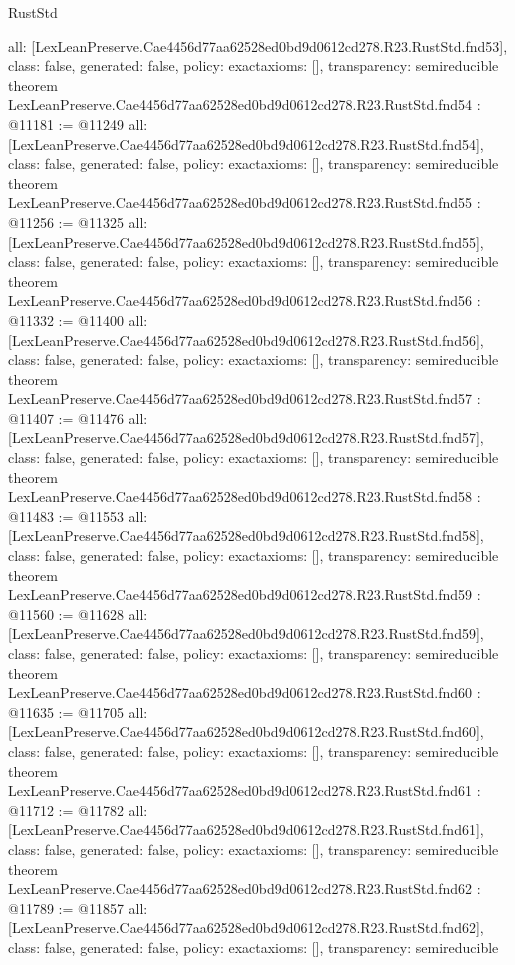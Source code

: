 \begin{lexlean}{RustStd}
\begin{coremodule}
{  all: [LexLeanPreserve.Cae4456d77aa62528ed0bd9d0612cd278.R23.RustStd.fnd53],
  class: false,
  generated: false,
  policy: exact{axioms: []},
  transparency: semireducible
}
theorem LexLeanPreserve.Cae4456d77aa62528ed0bd9d0612cd278.R23.RustStd.fnd54 : @11181 := @11249 {
  all: [LexLeanPreserve.Cae4456d77aa62528ed0bd9d0612cd278.R23.RustStd.fnd54],
  class: false,
  generated: false,
  policy: exact{axioms: []},
  transparency: semireducible
}
theorem LexLeanPreserve.Cae4456d77aa62528ed0bd9d0612cd278.R23.RustStd.fnd55 : @11256 := @11325 {
  all: [LexLeanPreserve.Cae4456d77aa62528ed0bd9d0612cd278.R23.RustStd.fnd55],
  class: false,
  generated: false,
  policy: exact{axioms: []},
  transparency: semireducible
}
theorem LexLeanPreserve.Cae4456d77aa62528ed0bd9d0612cd278.R23.RustStd.fnd56 : @11332 := @11400 {
  all: [LexLeanPreserve.Cae4456d77aa62528ed0bd9d0612cd278.R23.RustStd.fnd56],
  class: false,
  generated: false,
  policy: exact{axioms: []},
  transparency: semireducible
}
theorem LexLeanPreserve.Cae4456d77aa62528ed0bd9d0612cd278.R23.RustStd.fnd57 : @11407 := @11476 {
  all: [LexLeanPreserve.Cae4456d77aa62528ed0bd9d0612cd278.R23.RustStd.fnd57],
  class: false,
  generated: false,
  policy: exact{axioms: []},
  transparency: semireducible
}
theorem LexLeanPreserve.Cae4456d77aa62528ed0bd9d0612cd278.R23.RustStd.fnd58 : @11483 := @11553 {
  all: [LexLeanPreserve.Cae4456d77aa62528ed0bd9d0612cd278.R23.RustStd.fnd58],
  class: false,
  generated: false,
  policy: exact{axioms: []},
  transparency: semireducible
}
theorem LexLeanPreserve.Cae4456d77aa62528ed0bd9d0612cd278.R23.RustStd.fnd59 : @11560 := @11628 {
  all: [LexLeanPreserve.Cae4456d77aa62528ed0bd9d0612cd278.R23.RustStd.fnd59],
  class: false,
  generated: false,
  policy: exact{axioms: []},
  transparency: semireducible
}
theorem LexLeanPreserve.Cae4456d77aa62528ed0bd9d0612cd278.R23.RustStd.fnd60 : @11635 := @11705 {
  all: [LexLeanPreserve.Cae4456d77aa62528ed0bd9d0612cd278.R23.RustStd.fnd60],
  class: false,
  generated: false,
  policy: exact{axioms: []},
  transparency: semireducible
}
theorem LexLeanPreserve.Cae4456d77aa62528ed0bd9d0612cd278.R23.RustStd.fnd61 : @11712 := @11782 {
  all: [LexLeanPreserve.Cae4456d77aa62528ed0bd9d0612cd278.R23.RustStd.fnd61],
  class: false,
  generated: false,
  policy: exact{axioms: []},
  transparency: semireducible
}
theorem LexLeanPreserve.Cae4456d77aa62528ed0bd9d0612cd278.R23.RustStd.fnd62 : @11789 := @11857 {
  all: [LexLeanPreserve.Cae4456d77aa62528ed0bd9d0612cd278.R23.RustStd.fnd62],
  class: false,
  generated: false,
  policy: exact{axioms: []},
  transparency: semireducible
}
\end{coremodule}
\end{lexlean}
